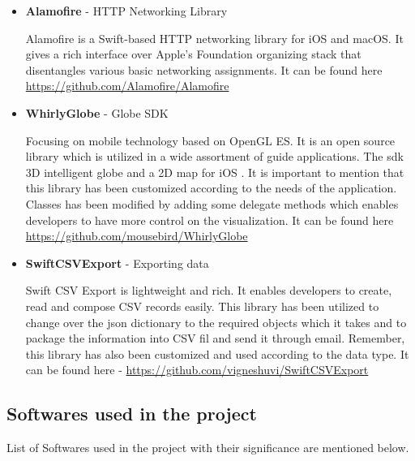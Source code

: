 \begin{itemize}
    \item \textbf{Alamofire} - HTTP Networking Library
    
    Alamofire is a Swift-based HTTP networking library for \gls{iOS} and \gls{macOS}. It gives a rich interface over Apple's Foundation organizing stack that disentangles various basic networking assignments\cite{Alamofire}. It can be found here \url{https://github.com/Alamofire/Alamofire} \\
   
    \item \textbf{WhirlyGlobe} - Globe SDK
    
    Focusing on mobile technology based on OpenGL ES. It is an open source library which is utilized in a wide assortment of guide applications. The \gls{sdk} 3D intelligent globe and a 2D map for \gls{iOS} \cite{WhirlyGlobe}. It is important to mention that this library has been customized according to the needs of the application. Classes has been modified by adding some delegate methods which enables developers to have more control on the visualization. It can be found here  \url{https://github.com/mousebird/WhirlyGlobe} \\
    
    \item \textbf{SwiftCSVExport} - Exporting data
    
    Swift CSV Export is lightweight and rich. It enables developers to create, read and compose CSV records easily\cite{Swift_CSV_Export}. This library has been utilized to change over the \gls{json} dictionary to the required objects which it takes and to package the information into CSV fil and send it through email. Remember, this library has also been customized and used according to the data type. It can be found here 
    - \url{https://github.com/vigneshuvi/SwiftCSVExport} \\ 
    
\end{itemize}

\subsection{Softwares used in the project}

List of Softwares used in the project with their significance are mentioned below.

